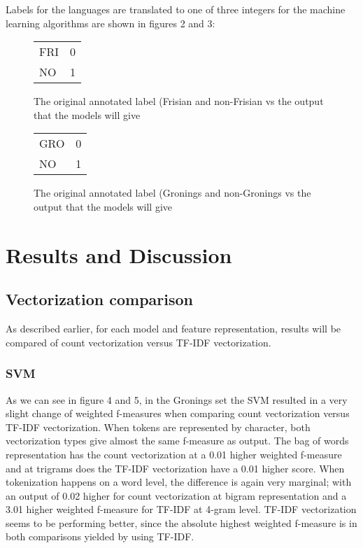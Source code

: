 \documentclass[
10pt, %
a4paper, %
oneside, %
headinclude,footinclude, %
] {book}%
\begin{document}
Labels for the languages are translated to one of three integers for the machine learning algorithms are shown in figures 2 and 3:
\newpage

\begin{figure}[h]
\begin{tabular}{ll}
	FRI & 0 \\
	NO & 1 \\
\end{tabular}
	\caption{The original annotated label (Frisian and non-Frisian vs the output that the models will give}
\end{figure}

\begin{figure}[h]
\begin{tabular}{ll}
	GRO & 0 \\
	NO & 1 \\
\end{tabular}
	\caption{The original annotated label (Gronings and non-Gronings vs the output that the models will give}
\end{figure}


\chapter{Results and Discussion}
\section{Vectorization comparison}
As described earlier, for each model and feature representation, results will be compared of count vectorization versus TF-IDF vectorization.

\subsection{SVM}

As we can see in figure 4 and 5, in the Gronings set the SVM resulted in a very slight change of weighted f-measures when comparing count vectorization versus TF-IDF vectorization. When tokens are represented by character, both vectorization types give almost the same f-measure as output. The bag of words representation has the count vectorization at a 0.01 higher weighted f-measure and at trigrams does the TF-IDF vectorization have a 0.01 higher score. When tokenization happens on a word level, the difference is again very marginal; with an output of 0.02 higher for count vectorization at bigram representation and a 3.01 higher weighted f-measure for TF-IDF at 4-gram level. TF-IDF vectorization seems to be performing better, since the absolute highest weighted f-measure is in both comparisons yielded by using TF-IDF.
\end{document}
